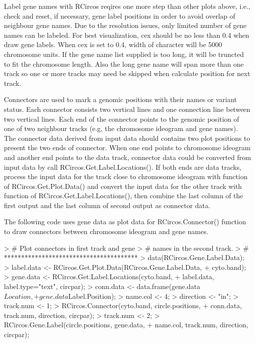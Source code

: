 \documentclass{article}
\begin{document}
Label gene names with RCircos reqires one more step than other plots above, i.e., check and reset, if necessary, gene label positions in order to avoid overlap of neighbour gene names. Due to the resolution issues, only limited number of gene names can be labeled. For best visualization, cex should be no less than 0.4 when draw gene labels. When cex is set to 0.4, width of character will be 5000 chromosome units. If the gene name list supplied is too long, it will be truncted to fit the chromosome length. Also the long gene name will span more than one track so one or more tracks may need be skipped when calculate position for next track.

Connectors are used to mark a genomic positions with their names or variant status. Each connector consists two vertical lines and one connection line between two vertical lines. Each end of the connector points to the genomic position of one of two neighbour tracks (e.g, the chromosome ideogram and gene names). The connector data derived from input data should contains two plot positions to present the two ends of connector. When one end points to chromosome ideogram and another end points to the data track, connector data could be converted from input data by call RCircos.Get.Label.Locations(). If both ends are data tracks, process the input data for the track close to chromosome ideogram with function of RCircos.Get.Plot.Data() and convert the input data for the other track with function of RCircos.Get.Label.Locations(), then combine the last column of the first output and the last column of second output as connector data.

The following code uses gene data as plot data for RCircos.Connector() function to draw connectors between chromosome ideogram and gene names.

\begin{Schunk}
\begin{Sinput}
> #	Plot connectors in first track and gene
> #	names in the second track. 
> #	***************************************
> data(RCircos.Gene.Label.Data);
> label.data <- RCircos.Get.Plot.Data(RCircos.Gene.Label.Data, 
+ 			cyto.band);
> gene.data <- RCircos.Get.Label.Locations(cyto.band, 
+ 			label.data, label.type="text", circpar);
> conn.data <- data.frame(gene.data$Location, 
+ 			gene.data$Label.Position);
> name.col <- 4;
> direction <- "in";
> track.num <- 1;
> RCircos.Connector(cyto.band, circle.positions, 
+ 	conn.data, track.num, direction, circpar);
> track.num <- 2;
> RCircos.Gene.Label(circle.positions, gene.data, 
+ 	name.col, track.num, direction,  circpar);
\end{Sinput}
\end{Schunk}
\end{document}
